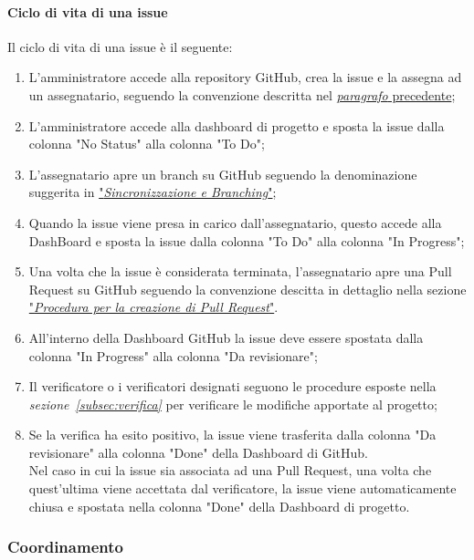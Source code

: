 \paragraph*{Ciclo di vita di una issue}
Il ciclo di vita di una issue è il seguente:
\begin{enumerate}
    \item L'amministratore accede alla repository GitHub, crea la issue e la assegna ad un assegnatario, seguendo la convenzione descritta nel \hyperlink{par:proceduraCreazioneIssue}{\textit{paragrafo} precedente};
    \item L'amministratore accede alla dashboard di progetto e sposta la issue dalla colonna "No Status" alla colonna "To Do";
    \item L'assegnatario apre un branch su GitHub seguendo la denominazione suggerita in \hyperlink{par:sincronizzazione&branching}{"\textit{Sincronizzazione e Branching}"};
    \item Quando la issue viene presa in carico dall'assegnatario, questo accede alla DashBoard e sposta la issue dalla colonna "To Do" alla colonna "In Progress";
    \item Una volta che la issue è considerata terminata, l'assegnatario apre una Pull Request su GitHub seguendo la convenzione descitta in dettaglio nella sezione \hyperlink{par:creazionePR}{"\textit{Procedura per la creazione di Pull Request}"}.
    \item All'interno della Dashboard GitHub la issue deve essere spostata dalla colonna "In Progress" alla colonna "Da revisionare";
    \item Il verificatore o i verificatori designati seguono le procedure esposte nella \textit{sezione~\ref{subsec:verifica}} per verificare le modifiche apportate al progetto;
    \item Se la verifica ha esito positivo, la issue viene trasferita dalla colonna "Da revisionare" alla colonna "Done" della Dashboard di GitHub. \\
    Nel caso in cui la issue sia associata ad una Pull Request, una volta che quest'ultima viene accettata dal verificatore, la issue viene automaticamente chiusa e spostata nella colonna "Done" della Dashboard di progetto. 
\end{enumerate}

\subsubsection{Coordinamento}

